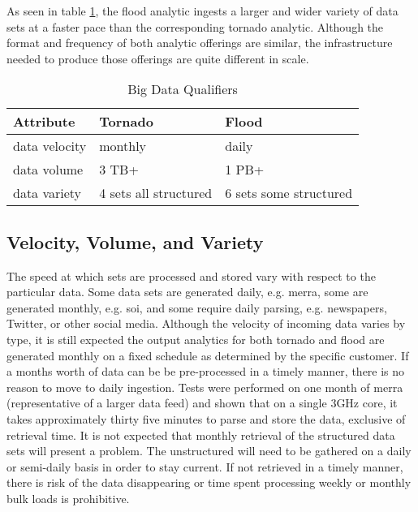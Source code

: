 As seen in table \ref{qualifiers},  the flood analytic ingests a larger and wider variety of data sets at a faster pace than the corresponding tornado analytic. Although the format and frequency of both analytic offerings are similar, the infrastructure needed to produce those offerings are quite different in scale.
\begin{table}[htbp]
    \centering
    \begin{tabular}{l l l}
        \hline
        Attribute & Tornado & Flood\\ [0.5ex]
        \hline
        data velocity & monthly & daily\\
        data volume &  3 TB+  & 1 PB+\\
        data variety &  4 sets all structured & 6 sets some structured\\
        \hline
    \end{tabular}
    \caption{Big Data Qualifiers}
    \label{qualifiers}
\end{table}
\subsection{Velocity, Volume, and Variety}
The speed at which sets are processed and stored vary with respect to the particular data. Some data sets are generated daily, e.g. \gls{merra}, some are generated monthly, e.g. \gls{soi}, and some require daily parsing, e.g. newspapers, Twitter, or other social media. Although the velocity of incoming data varies by type, it is still expected the output analytics for both tornado and flood are generated monthly on a fixed schedule as determined by the specific customer. If a months worth of data can be be pre-processed in a timely manner, there is no reason to move to daily ingestion. Tests were performed on one month of  \gls{merra} (representative of a larger data feed) and shown that on a single 3GHz core, it takes approximately thirty five minutes to parse and store the data, exclusive of retrieval time. It is not expected that monthly retrieval of the structured data sets will present a problem. The unstructured will need to be gathered  on a daily or semi-daily basis in order to stay current. If not retrieved in a timely manner, there is risk of the data disappearing or time spent processing weekly or monthly bulk loads is prohibitive.\\

